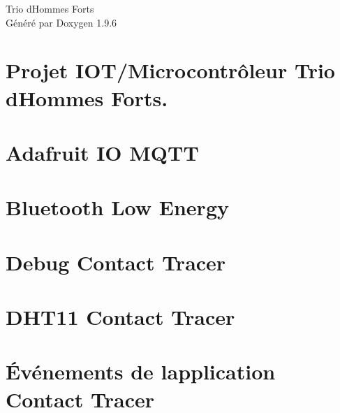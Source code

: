 \documentclass[twoside]{book}
\newcommand{\+}{\discretionary{\mbox{\scriptsize$\hookleftarrow$}}{}{}}
\newcommand{\clearemptydoublepage}{%
    \newpage{\pagestyle{empty}\cleardoublepage}%
  }
\begin{document}
  \raggedbottom
    \hypersetup{pageanchor=false,
                bookmarksnumbered=true,
                pdfencoding=unicode
               }
  \begin{titlepage}
  \vspace*{7cm}
  \begin{center}%
  {\Large Trio d\textquotesingle{}\+Hommes Forts}\\
  \vspace*{1cm}
  {\large Généré par Doxygen 1.9.6}\\
  \end{center}
  \end{titlepage}
  \clearemptydoublepage
  \tableofcontents
  \clearemptydoublepage
  \hypersetup{pageanchor=true}
\chapter{Projet IOT/\+Microcontrôleur Trio d\textquotesingle{}Hommes Forts.}
\label{index}\hypertarget{index}{}
\chapter{Adafruit IO MQTT}
\label{_adafruit_i_o}

\chapter{Bluetooth Low Energy}
\label{_c_t_b_l_e}

\chapter{Debug Contact Tracer}
\label{_c_t_debug}

\chapter{DHT11 Contact Tracer}
\label{_c_t_d_h_t}

\chapter{Événements de l\textquotesingle{}application Contact Tracer}
\label{_c_t_events}

\end{document}
